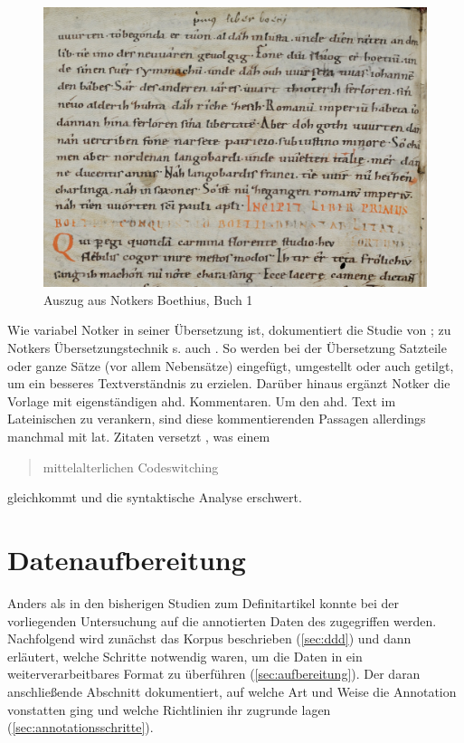  \begin{figure}[h]
\begin{center}
  \includegraphics[width=10 cm]{images/notker-handschrift-buch1-ausschnitt.jpg}
\caption {Auszug aus Notkers Boethius, Buch 1}
\label{abb:notker-hand}
\end{center}
\end{figure} 


Wie variabel Notker in seiner Übersetzung ist, dokumentiert die Studie von \textcite{Eilers2003}; zu Notkers Übersetzungstechnik s. auch \textcite{Glauch2003}. So werden bei der Übersetzung Satzteile oder ganze Sätze (vor allem Nebensätze) eingefügt, umgestellt oder auch getilgt, um ein besseres Textverständnis zu erzielen. Darüber hinaus ergänzt Notker die Vorlage mit eigenständigen ahd. Kommentaren. Um den ahd. Text im Lateinischen zu verankern, sind diese kommentierenden Passagen allerdings manchmal mit lat. Zitaten versetzt \parencite[vgl.][137]{Sonderegger2003}, was einem \blockcquote{Glaser2016}{mittelalterlichen Codeswitching} gleichkommt und die syntaktische Analyse erschwert.  


\section{Datenaufbereitung} \label{sec:datenaufbereitung}

Anders als in den bisherigen Studien zum Definitartikel konnte bei der vorliegenden Untersuchung auf die annotierten Daten des  zugegriffen werden. Nachfolgend wird zunächst das Korpus beschrieben (\ref{sec:ddd}) und dann erläutert, welche Schritte notwendig waren, um die Daten in ein weiterverarbeitbares Format zu überführen (\ref{sec:aufbereitung}). Der daran anschließende Abschnitt dokumentiert, auf welche Art und Weise die Annotation vonstatten ging und welche Richtlinien ihr zugrunde lagen (\ref{sec:annotationsschritte}).

